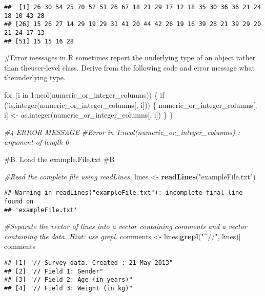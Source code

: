\documentclass[
]{article}
\newenvironment{Shaded}{\begin{snugshade}}{\end{snugshade}}
\newcommand{\CommentTok}[1]{\textcolor[rgb]{0.56,0.35,0.01}{\textit{#1}}}
\newcommand{\FunctionTok}[1]{\textcolor[rgb]{0.13,0.29,0.53}{\textbf{#1}}}
\newcommand{\NormalTok}[1]{#1}
\newcommand{\OtherTok}[1]{\textcolor[rgb]{0.56,0.35,0.01}{#1}}
\newcommand{\StringTok}[1]{\textcolor[rgb]{0.31,0.60,0.02}{#1}}
\begin{document}
\begin{verbatim}
##  [1] 26 30 54 25 70 52 51 26 67 18 21 29 17 12 18 35 30 36 36 21 24 18 10 43 28
## [26] 15 26 27 14 29 19 29 31 41 20 44 42 26 19 16 39 28 21 39 29 20 21 24 17 13
## [51] 15 15 16 28
\end{verbatim}

\#Error messages in R sometimes report the underlying type of an object
rather than theuser-level class. Derive from the following code and
error message what theunderlying type.

for (i in 1:ncol(numeric\_or\_integer\_columns)) \{ if
(!is.integer(numeric\_or\_integer\_columns{[}, i{]})) \{
numeric\_or\_integer\_columns{[}, i{]} \textless-
as.integer(numeric\_or\_integer\_columns{[}, i{]}) \} \}

\begin{Shaded}
\begin{Highlighting}[]
\CommentTok{\#4 ERROR MESSAGE}
\CommentTok{\#Error in 1:ncol(numeric\_or\_integer\_columns) : argument of length 0}
\end{Highlighting}
\end{Shaded}

\#B. Load the example.File.txt \#B

\begin{Shaded}
\begin{Highlighting}[]
\CommentTok{\#Read the complete file using readLines.}
\NormalTok{lines }\OtherTok{\textless{}{-}} \FunctionTok{readLines}\NormalTok{(}\StringTok{"exampleFile.txt"}\NormalTok{)}
\end{Highlighting}
\end{Shaded}

\begin{verbatim}
## Warning in readLines("exampleFile.txt"): incomplete final line found on
## 'exampleFile.txt'
\end{verbatim}

\begin{Shaded}
\begin{Highlighting}[]
\CommentTok{\#Separate the vector of lines into a vector containing comments and a vector containing the data. Hint: use grepl.}
\NormalTok{comments }\OtherTok{\textless{}{-}}\NormalTok{ lines[}\FunctionTok{grepl}\NormalTok{(}\StringTok{"\^{}//"}\NormalTok{, lines)]}
\NormalTok{comments}
\end{Highlighting}
\end{Shaded}

\begin{verbatim}
## [1] "// Survey data. Created : 21 May 2013"
## [2] "// Field 1: Gender"                   
## [3] "// Field 2: Age (in years)"           
## [4] "// Field 3: Weight (in kg)"
\end{verbatim}
\end{document}

